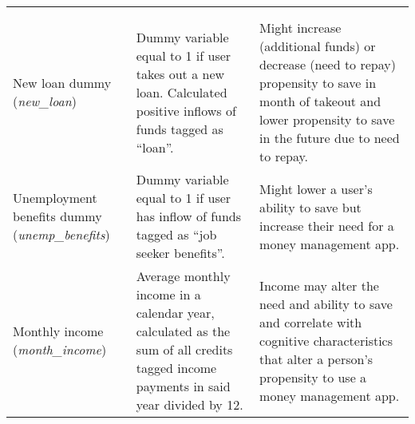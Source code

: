 \begin{table}[htpb]
\begin{tabularx}{\textwidth}{>{\raggedright\arraybackslash}X
        >{\raggedright\arraybackslash}X>{\raggedright\arraybackslash}X}
    \multicolumn{3}{c}{\textbf{Covariates}}\\\\

    New loan dummy (\textit{new\_loan})&
    Dummy variable equal to 1 if user takes out a new loan. Calculated positive inflows
    of funds tagged as ``loan''.&
    Might increase (additional funds) or decrease (need to repay) propensity to
    save in month of takeout and lower propensity to save in the future due to
    need to repay.\\

    Unemployment benefits dummy (\textit{unemp\_benefits})&
    Dummy variable equal to 1 if user has inflow of funds tagged as ``job
    seeker benefits''.&
    Might lower a user's ability to save but increase their need for a money
    management app.\\

    Monthly income (\textit{month\_income})&
    Average monthly income in a calendar year, calculated as the sum of all
    credits tagged income payments in said year divided by 12.&
    Income may alter the need and ability to save and correlate with cognitive
    characteristics that alter a person's propensity to use a money management
    app.\\

    \hline\hline
    \end{tabularx}
\end{table}

